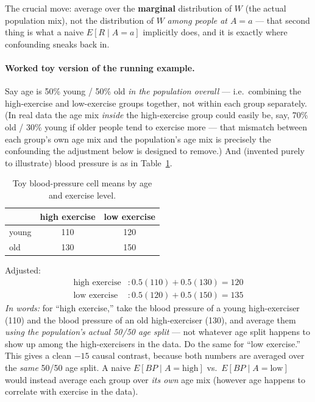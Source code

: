 The crucial move: average over the \textbf{marginal} distribution of $W$
(the actual population mix), not the distribution of $W$ \emph{among people
at $A=a$} --- that second thing is what a naive $E[R\mid A=a]$ implicitly
does, and it is exactly where confounding sneaks back in.

\paragraph{Worked toy version of the running example.} Say age is 50\% young
/ 50\% old \emph{in the population overall} --- i.e.\ combining the
high-exercise and low-exercise groups together, not within each group
separately. (In real data the age mix \emph{inside} the high-exercise group
could easily be, say, 70\% old / 30\% young if older people tend to
exercise more --- that mismatch between each group's own age mix and the
population's age mix is precisely the confounding the adjustment below is
designed to remove.) And (invented purely to illustrate) blood pressure is
as in Table~\ref{tab:toy-backdoor}.

\begin{table}[h]
\centering
\begin{tabular}{lcc}
\toprule
 & high exercise & low exercise \\
\midrule
young & 110 & 120 \\
old   & 130 & 150 \\
\bottomrule
\end{tabular}
\caption{Toy blood-pressure cell means by age and exercise level.}
\label{tab:toy-backdoor}
\end{table}

Adjusted:
\begin{align*}
  \text{high exercise} &: 0.5(110) + 0.5(130) = 120 \\
  \text{low exercise}  &: 0.5(120) + 0.5(150) = 135
\end{align*}
\emph{In words:} for ``high exercise,'' take the blood pressure of a young
high-exerciser (110) and the blood pressure of an old high-exerciser (130),
and average them \emph{using the population's actual 50/50 age split} ---
not whatever age split happens to show up among the high-exercisers in the
data. Do the same for ``low exercise.'' This gives a clean $-15$ causal contrast, because both numbers are averaged over
the \emph{same} 50/50 age split. A naive $E[BP \mid A{=}\text{high}]$ vs.\
$E[BP \mid A{=}\text{low}]$ would instead average each group over
\emph{its own} age mix (however age happens to correlate with exercise in
the data).

